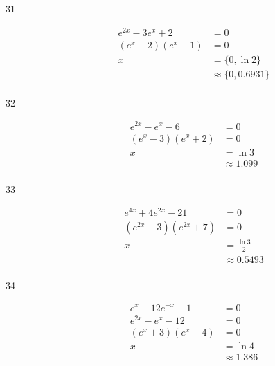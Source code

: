 \documentclass{exam}
\begin{document}
\begin{description}
      \item[31]
        \begin{align*}
          e^{2x} - 3e^x + 2  & = 0 \\
          (e^x - 2)(e^x - 1) & = 0 \\
          x                  & = \{ 0, \ln 2 \}  \\
                             & \approx \boxed{ \{ 0, 0.6931 \} } \\
        \end{align*}

      \item[32]
        \begin{align*}
          e^{2x} - e^x - 6   & = 0 \\
          (e^x - 3)(e^x + 2) & = 0 \\
          x                  & = \ln 3 \\
                             & \approx \boxed{ 1.099 }  \\
        \end{align*}

      \item[33]
        \begin{align*}
          e^{4x} + 4e^{2x} - 21    & = 0 \\
          (e^{2x} - 3)(e^{2x} + 7) & = 0 \\
          x                        & = \frac{\ln 3}{2} \\
                                   & \approx \boxed{ 0.5493 } \\
        \end{align*}

      \item[34]
        \begin{align*}
          e^x - 12e^{-x} - 1 & = 0 \\
          e^{2x} - e^x - 12  & = 0 \\
          (e^x + 3)(e^x - 4) & = 0 \\
          x                  & = \ln 4 \\
                             & \approx \boxed{ 1.386 } \\
        \end{align*}



\end{description}
\end{document}
